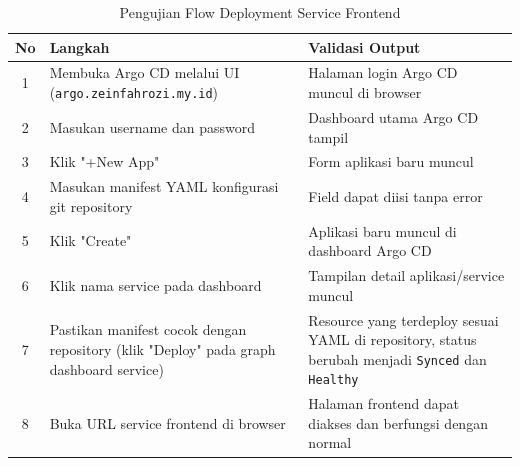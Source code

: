 \begin{table}[H]
  \centering
  \small
  \begin{tabular}{|c|p{6cm}|p{8cm}|}
    \hline
    \textbf{No} & \textbf{Langkah}                                                                       & \textbf{Validasi Output}                                                                                       \\
    \hline
    1           & Membuka Argo CD melalui UI (\texttt{argo.zeinfahrozi.my.id})                           & Halaman login Argo CD muncul di browser                                                                        \\
    \hline
    2           & Masukan username dan password                                                          & Dashboard utama Argo CD tampil                                                                                 \\
    \hline
    3           & Klik "+New App"                                                                        & Form aplikasi baru muncul                                                                                      \\
    \hline
    4           & Masukan manifest YAML konfigurasi git repository                                       & Field dapat diisi tanpa error                                                                                  \\
    \hline
    5           & Klik "Create"                                                                          & Aplikasi baru muncul di dashboard Argo CD                                                                      \\
    \hline
    6           & Klik nama service pada dashboard                                                       & Tampilan detail aplikasi/service muncul                                                                        \\
    \hline
    7           & Pastikan manifest cocok dengan repository (klik "Deploy" pada graph dashboard service) & Resource yang terdeploy sesuai YAML di repository, status berubah menjadi \texttt{Synced} dan \texttt{Healthy} \\
    \hline
    8           & Buka URL service frontend di browser                                                   & Halaman frontend dapat diakses dan berfungsi dengan normal                                                     \\
    \hline
  \end{tabular}
  \caption{Pengujian Flow Deployment Service Frontend}
  \label{tab:pengujian-flow-deployment-frontend}
\end{table}
